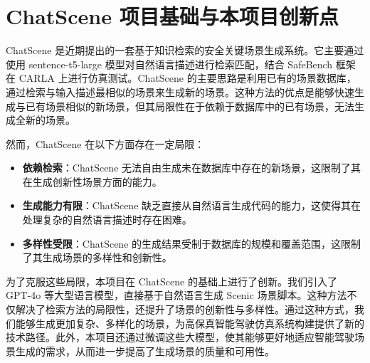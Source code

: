 \section{ChatScene 项目基础与本项目创新点}
ChatScene 是近期提出的一套基于知识检索的安全关键场景生成系统。它主要通过使用 sentence-t5-large 模型对自然语言描述进行检索匹配，结合 SafeBench 框架在 CARLA 上进行仿真测试。ChatScene 的主要思路是利用已有的场景数据库，通过检索与输入描述最相似的场景来生成新的场景。这种方法的优点是能够快速生成与已有场景相似的新场景，但其局限性在于依赖于数据库中的已有场景，无法生成全新的场景。

然而，ChatScene 在以下方面存在一定局限：
\begin{itemize}
	\item \textbf{依赖检索}：ChatScene 无法自由生成未在数据库中存在的新场景，这限制了其在生成创新性场景方面的能力。
	\item \textbf{生成能力有限}：ChatScene 缺乏直接从自然语言生成代码的能力，这使得其在处理复杂的自然语言描述时存在困难。
	\item \textbf{多样性受限}：ChatScene 的生成结果受制于数据库的规模和覆盖范围，这限制了其生成场景的多样性和创新性。
\end{itemize}

为了克服这些局限，本项目在 ChatScene 的基础上进行了创新。我们引入了 GPT-4o 等大型语言模型，直接基于自然语言生成 Scenic 场景脚本。这种方法不仅解决了检索方法的局限性，还提升了场景的创新性与多样性。通过这种方式，我们能够生成更加复杂、多样化的场景，为高保真智能驾驶仿真系统构建提供了新的技术路径。此外，本项目还通过微调这些大模型，使其能够更好地适应智能驾驶场景生成的需求，从而进一步提高了生成场景的质量和可用性。